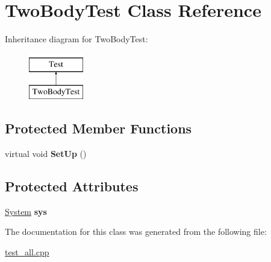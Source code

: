 \hypertarget{classTwoBodyTest}{\section{Two\-Body\-Test Class Reference}
\label{classTwoBodyTest}
}
Inheritance diagram for Two\-Body\-Test\-:\begin{figure}[H]
\begin{center}
\leavevmode
\includegraphics[height=2.000000cm]{classTwoBodyTest}
\end{center}
\end{figure}
\subsection*{Protected Member Functions}
\begin{DoxyCompactItemize}
\item 
\hypertarget{classTwoBodyTest_a4d0809850c63485d08436b3187253d09}{virtual void {\bfseries Set\-Up} ()}\label{classTwoBodyTest_a4d0809850c63485d08436b3187253d09}

\end{DoxyCompactItemize}
\subsection*{Protected Attributes}
\begin{DoxyCompactItemize}
\item 
\hypertarget{classTwoBodyTest_a1ce7e0ef1625120f9ba15197c70dde9f}{\hyperlink{classsim__system_1_1System}{System} {\bfseries sys}}\label{classTwoBodyTest_a1ce7e0ef1625120f9ba15197c70dde9f}

\end{DoxyCompactItemize}


The documentation for this class was generated from the following file\-:\begin{DoxyCompactItemize}
\item 
\hyperlink{test__all_8cpp}{test\-\_\-all.\-cpp}\end{DoxyCompactItemize}
